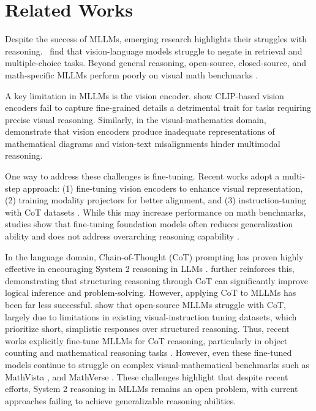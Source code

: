 \section{Related Works}
Despite the success of MLLMs, emerging research highlights their struggles with reasoning.~\citet{alhamoud2025vision} find that vision-language models struggle to negate in retrieval and multiple-choice tasks. Beyond general reasoning, open-source, closed-source, and math-specific MLLMs perform poorly on visual math benchmarks \cite{mathvision, zhang2024mathversedoesmultimodalllm}. 

A key limitation in MLLMs is the vision encoder. \citet{clip-blind} show CLIP-based vision encoders fail to capture fine-grained details \textemdash a detrimental trait for tasks requiring precise visual reasoning. Similarly, in the visual-mathematics domain, \citet{g-llava, math-llava, mavis, mathpuma} demonstrate that vision encoders produce inadequate representations of mathematical diagrams and vision-text misalignments  hinder multimodal reasoning.

One way to address these challenges is fine-tuning. Recent works adopt a multi-step approach: (1) fine-tuning vision encoders to enhance visual representation, (2) training modality projectors for better alignment, and (3) instruction-tuning with CoT datasets \cite{g-llava, math-llava, mavis, mathpuma}. While this may increase performance on math benchmarks, studies show that fine-tuning foundation models often reduces generalization ability and does not address overarching reasoning capability \cite{generalization_fine_tuning, sft_generalize}.

In the language domain, Chain-of-Thought (CoT) prompting has proven highly effective in encouraging System 2 reasoning in LLMs \cite{cot}. \citet{xiang2025towards} further reinforces this, demonstrating that structuring reasoning through CoT can significantly improve logical inference and problem-solving. However, applying CoT to MLLMs has been far less successful. \citet{vlm_cot} show that open-source MLLMs struggle with CoT, largely due to limitations in existing visual-instruction tuning datasets, which prioritize short, simplistic responses over structured reasoning. Thus, recent works explicitly fine-tune MLLMs for CoT reasoning, particularly in object counting and mathematical reasoning tasks \cite{vlm_cot, mavis, mathpuma, molmo}. However, even these fine-tuned models continue to struggle on complex visual-mathematical benchmarks such as MathVista \cite{math-vista}, and MathVerse \cite{zhang2024mathversedoesmultimodalllm}. These challenges highlight that despite recent efforts, System 2 reasoning in MLLMs remains an open problem, with current approaches failing to achieve generalizable reasoning abilities.